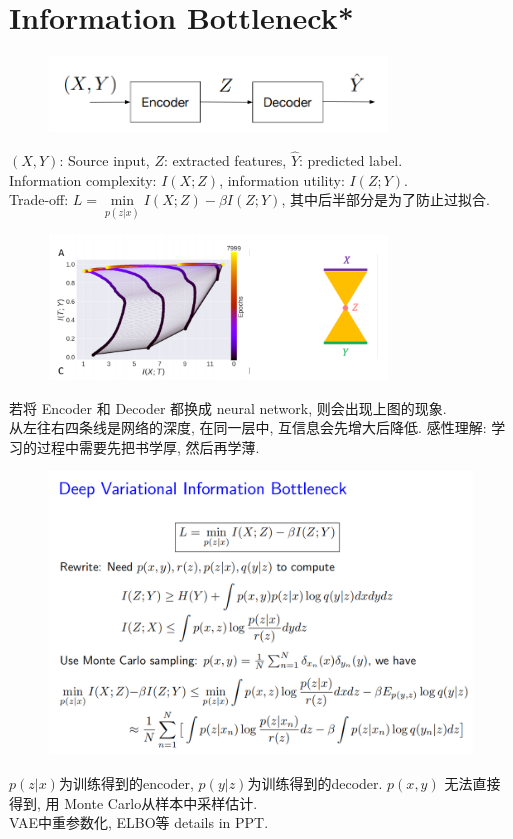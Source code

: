 \chapter{Information Bottleneck*}
\begin{figure}[htbp]
    \centering
    \includegraphics[width=0.8\textwidth]{./figures/chapter9/AE.png}
\end{figure}
$(X, Y)$: Source input, $Z$: extracted features, $\hat{Y}$: predicted label. \\
Information complexity: $I(X;Z)$, information utility: $I(Z;Y)$. \\
Trade-off: $L = \min\limits_{p(z|x)} I(X;Z) - \beta I(Z;Y)$, 其中后半部分是为了防止过拟合.

\begin{figure}[htbp]
    \centering
    \includegraphics[width=0.8\textwidth]{./figures/chapter9/bottleneck.png}
\end{figure}
若将 Encoder 和 Decoder 都换成 neural network, 则会出现上图的现象. \\
从左往右四条线是网络的深度, 在同一层中, 互信息会先增大后降低. 感性理解: 学习的过程中需要先把书学厚, 然后再学薄.

\begin{figure}[htbp]
    \centering
    \includegraphics[width=\textwidth]{./figures/chapter9/result.png}
\end{figure}
$p(z|x)$为训练得到的encoder, $p(y|z)$为训练得到的decoder. $p(x,y)$ 无法直接得到, 用 Monte Carlo从样本中采样估计. \\
VAE中重参数化, ELBO等 details in PPT.